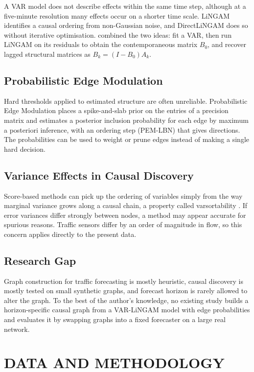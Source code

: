 \documentclass[MTech]{ugthesis}
\begin{document}
A VAR model does not describe effects within the same time step, although at a five-minute resolution many effects occur on a shorter time scale. LiNGAM \citep{shimizu2006lingam} identifies a causal ordering from non-Gaussian noise, and DirectLiNGAM \citep{shimizu2011directlingam} does so without iterative optimisation. \citet{hyvarinen2010} combined the two ideas: fit a VAR, then run LiNGAM on its residuals to obtain the contemporaneous matrix $B_0$, and recover lagged structural matrices as $B_k=(I-B_0)A_k$.

\section{Probabilistic Edge Modulation}
Hard thresholds applied to estimated structure are often unreliable. Probabilistic Edge Modulation \citep{hwang2026pem} places a spike-and-slab prior on the entries of a precision matrix and estimates a posterior inclusion probability for each edge by maximum a posteriori inference, with an ordering step (PEM-LBN) that gives directions. The probabilities can be used to weight or prune edges instead of making a single hard decision.

\section{Variance Effects in Causal Discovery}
Score-based methods can pick up the ordering of variables simply from the way marginal variance grows along a causal chain, a property called varsortability \citep{reisach2021}. If error variances differ strongly between nodes, a method may appear accurate for spurious reasons. Traffic sensors differ by an order of magnitude in flow, so this concern applies directly to the present data.

\section{Research Gap}
Graph construction for traffic forecasting is mostly heuristic, causal discovery is mostly tested on small synthetic graphs, and forecast horizon is rarely allowed to alter the graph. To the best of the author's knowledge, no existing study builds a horizon-specific causal graph from a VAR-LiNGAM model with edge probabilities and evaluates it by swapping graphs into a fixed forecaster on a large real network.

\chapter{DATA AND METHODOLOGY}
\end{document}
